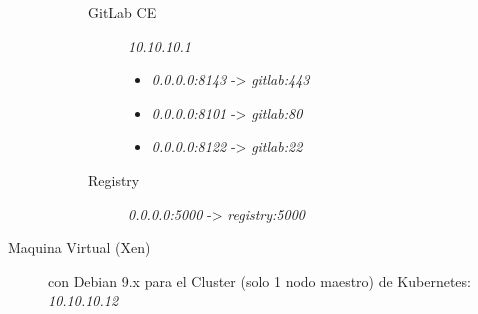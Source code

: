 \begin{description}
\begin{description}
\begin{description}
        	\item[GitLab CE] \textit{10.10.10.1}
            \begin{itemize}
            	\item \textit{0.0.0.0:8143} -> \textit{gitlab:443}
            	\item \textit{0.0.0.0:8101} -> \textit{gitlab:80}
            	\item \textit{0.0.0.0:8122} -> \textit{gitlab:22}
            \end{itemize}
            \item[Registry] \textit{0.0.0.0:5000} -> \textit{registry:5000}
        \end{description}
    \end{description}
    \item[Maquina Virtual (Xen)] con Debian 9.x para el Cluster (solo 1 nodo maestro) de Kubernetes: \textit{10.10.10.12}
\end{description}

